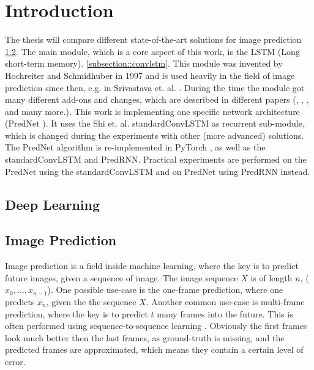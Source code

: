 \section{Introduction} \label{section::introduction}
 The thesis will compare different state-of-the-art solutions for image prediction \ref{subsection::imageprediction}.
 The main module, which is a core aspect of this work, is the LSTM (Long short-term memory). \ref{subsection::convlstm}.
 This module was invented by Hochreiter and Schmidhuber  \cite{Hochreiter1997} in 1997 and is used heavily in the field of image prediction since then, e.g. in Srivastava et. al. 
 \cite{Srivastava2015}.
 During the time the module got many different add-ons and changes, which are described in different papers (\cite{Patraucean2015}, \cite{Lotter2016}, \cite{Wang2017}, \cite{Wang2018} and many 
 more.). This work is implementing one specific network architecture (PredNet \cite{Lotter2016}).
 It uses the Shi et. al. \glqq standard\grqq ConvLSTM \cite{Shi2015} as recurrent sub-module, which is changed during the experiments
 with other (more advanced) solutions. The PredNet algorithm is re-implemented in PyTorch \cite{Paszke2019}, as well as the \glqq standard\grqq ConvLSTM and PredRNN.
 Practical experiments are performed on the PredNet using the \glqq standard\grqq ConvLSTM and on PredNet using PredRNN instead.
 
 \subsection{Deep Learning} \label{subsection::deeplearning}
 
 \subsection{Image Prediction} \label{subsection::imageprediction}
  Image prediction is a field inside machine learning, where the key is to predict future images, given a sequence of image. The image sequence $X$ is of length $n$, ($x_0, \ldots, x_{n-1}$).
  One possible use-case is the one-frame prediction, where one predicts $x_n$, given the the sequence $X$. Another common use-case is multi-frame prediction, where the key is to predict $t$ many
  frames into the future. This is often performed using sequence-to-sequence learning \cite{Sutskever2014}. Obviously the first frames look much better then the last frames, as ground-truth is 
  missing, and the predicted frames are approximated, which means they contain a certain level of error.

